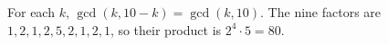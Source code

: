 For each $k$, $\gcd(k,10-k)=\gcd(k,10)$. The nine factors are $1,2,1,2,5,2,1,2,1$, so their product is $2^4\cdot5=\boxed{80}$.
